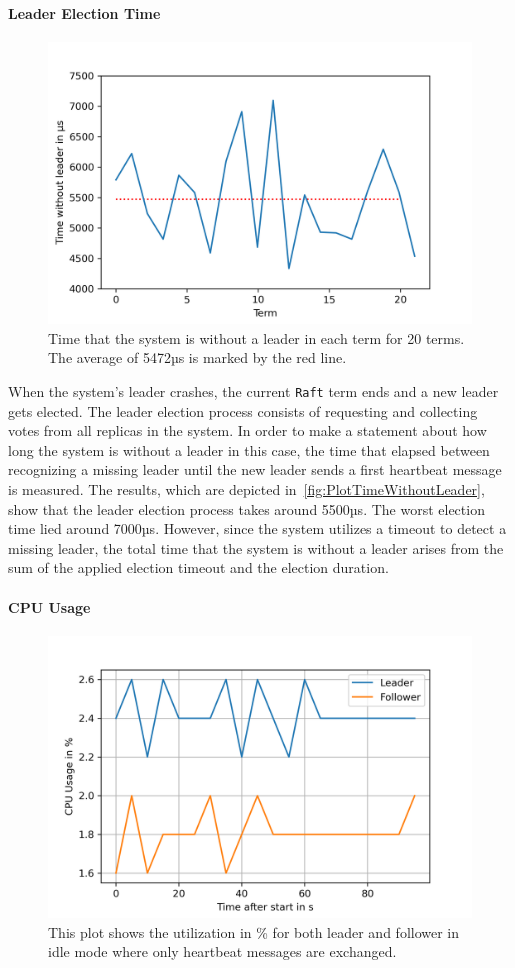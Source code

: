\paragraph{Leader Election Time}
\begin{figure}[!hb]
	\centering
	\includegraphics[width=0.75\linewidth]{images/plots/timeWithoutLeader}
	\caption{Time that the system is without a leader in each term for 20 terms. The average of 5472µs is marked by the red line.}
	\label{fig:PlotTimeWithoutLeader}
\end{figure}

When the system's leader crashes, the current \texttt{Raft} term ends and a new leader gets elected.
The leader election process consists of requesting and collecting votes from all replicas in the system.
In order to make a statement about how long the system is without a leader in this case, the time that elapsed between recognizing a missing leader until the new leader sends a first heartbeat message is measured.
The results, which are depicted in~\autoref{fig:PlotTimeWithoutLeader}, show that the leader election process takes around 5500µs.
The worst election time lied around 7000µs.
However, since the system utilizes a timeout to detect a missing leader, the total time that the system is without a leader arises from the sum of the applied election timeout and the election duration.

\paragraph{CPU Usage}
\begin{figure}[!hb]
	\centering
	\includegraphics[width=0.75\linewidth]{images/plots/CPUUsageIdleTime}
	\caption{This plot shows the  utilization in \% for both leader and follower in idle mode where only heartbeat messages are exchanged.}
	\label{fig:PlotCPUUsageIdleTime}
\end{figure}

